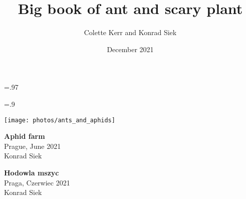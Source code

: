 \documentclass[a4paper,landscape,twoside]{memoir}
\begin{document}
\title{Big book of ant and scary plant}
\author{Colette Kerr and Konrad Siek}
\date{December 2021}

\newlength{\verticalheight}
\verticalheight=.97\textheight

\newlength{\landscapeheight}
\landscapeheight=.9\textheight

\newcommand{\blankpage}{%
    \null
    \thispagestyle{empty}%
    \addtocounter{page}{-1}%
    \newpage}

\newenvironment{rightbox}[1]
 {\itemize[
    nosep,
    leftmargin=\dimexpr\textwidth-#1\relax,
    rightmargin=0pt,
    itemindent=\parindent,
    listparindent=\parindent,
  ]\item[]\relax}
 {\enditemize}

\newcommand{\descriptioncolor}{white}
\pagecolor{black}

{\color{\descriptioncolor}
\maketitle
}


\pagebreak
\null\newpage

\noindent
\begin{minipage}[t]{.5\linewidth}{\color{\descriptioncolor}
    \texttt{[image: photos/ants\_and\_aphids]}
}\end{minipage}
\begin{minipage}[t][\verticalheight]{.4\linewidth}
\vfill
\begin{minipage}[b][.5\verticalheight]{\linewidth}{\color{\descriptioncolor}
    \textbf{Aphid farm} \\
    Prague, June 2021 \\
    Konrad Siek
}\end{minipage}
\begin{minipage}[b][.5\verticalheight]{\linewidth}{\color{\descriptioncolor}
    \textbf{Hodowla mszyc} \\
    Praga, Czerwiec 2021 \\
    Konrad Siek
}\end{minipage} 
\end{minipage}
\hfill

\pagebreak
\end{document}
